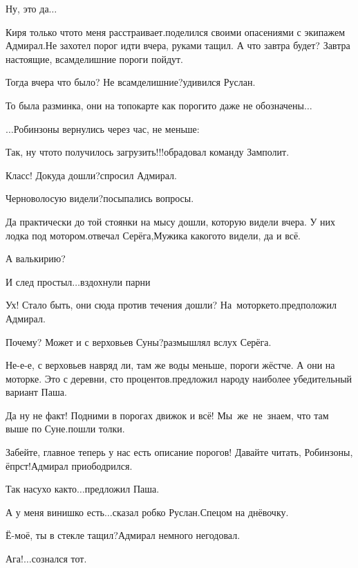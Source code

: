 \diagdash Ну, это да$\ldots$

\diagdash Киря только что\sdash то меня расстраивает.\mdash поделился своими опасениями с экипажем Адмирал.\mdash Не захотел порог идти вчера, руками тащил. А что завтра будет? Завтра настоящие, всамделишние пороги пойдут.

\diagdash Тогда вчера что было? Не всамделишние?\mdash удивился Руслан.

\diagdash То была разминка, они на топокарте как пороги\sdash то даже не обозначены$\ldots$

$\ldots$Робинзоны вернулись через час, не меньше:

\diagdash Так, ну что\sdash то получилось загрузить!!!\mdash обрадовал команду Замполит.

\diagdash Класс! Докуда дошли?\mdash спросил Адмирал.

\diagdash Черноволосую видели?\mdash посыпались вопросы.

\diagdash Да практически до той стоянки на мысу дошли, которую видели вчера. У них лодка под мотором.\mdash отвечал Серёга,\mdash Мужика какого\sdash то видели, да и всё.

\diagdash А валькирию?

\diagdash И след простыл$\ldots$\mdash вздохнули парни

\diagdash Ух! Стало быть, они сюда против течения дошли? На~моторке\sdash то.\mdash предположил Адмирал.

\diagdash Почему? Может и с верховьев Суны?\mdash размышлял вслух Серёга.

\diagdash Не-е-е, с верховьев навряд ли, там же воды меньше, пороги жёстче. А они на моторке. Это с деревни, сто процентов.\mdash предложил народу наиболее убедительный вариант Паша.

\diagdash Да ну не факт! Подними в порогах движок и всё! Мы~же~не~знаем, что там выше по Суне.\mdash пошли толки.

\diagdash Забейте, главное теперь у нас есть описание порогов! Давайте читать, Робинзоны, ёпрст!\mdash Адмирал приободрился.

\diagdash Так насухо как\sdash то$\ldots$\mdash предложил Паша.

\diagdash А у меня винишко есть$\ldots$\mdash сказал робко Руслан.\mdash Спецом на днёвочку.

\diagdash Ё-моё, ты в стекле тащил?\mdash Адмирал немного негодовал.

\diagdash Ага!$\ldots$\mdash сознался тот.


